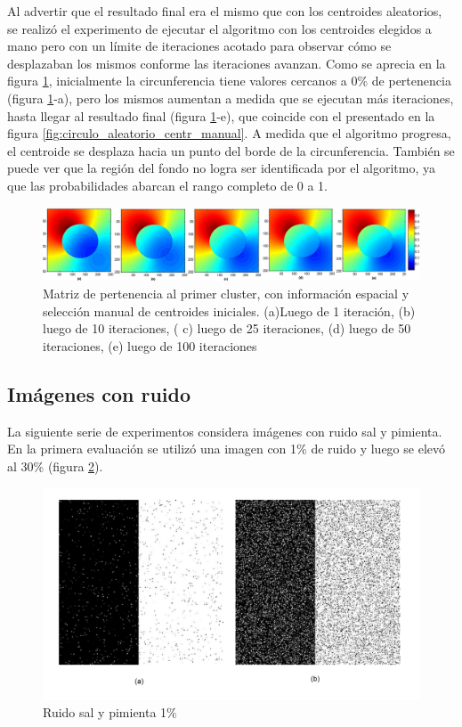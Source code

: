 Al advertir que el resultado final era el mismo que con los centroides aleatorios,  se realizó el experimento de ejecutar el algoritmo con los centroides elegidos a mano pero con un límite de iteraciones acotado para observar cómo se desplazaban los mismos conforme las iteraciones avanzan. Como se aprecia en la figura \ref{fig:circulo_iteraciones}, inicialmente la circunferencia tiene valores cercanos a $0\%$ de pertenencia (figura \ref{fig:circulo_iteraciones}-a), pero los mismos aumentan a medida que se ejecutan más iteraciones, hasta llegar al resultado final (figura \ref{fig:circulo_iteraciones}-e), que coincide con el presentado en la figura \ref{fig:circulo_aleatorio_centr_manual}. A medida que el algoritmo progresa, el centroide se desplaza hacia un punto del borde de la circunferencia. También se puede ver que la región del fondo no logra ser identificada por el algoritmo, ya que las probabilidades abarcan el rango completo de 0 a 1. 

\begin{figure}[h]
\centering
\includegraphics[scale=0.08]{images/circulo_iteraciones_x1.jpg}
\caption{Matriz de pertenencia al primer cluster, con información espacial y selección manual de centroides iniciales. (a)Luego de 1 iteración, (b) luego de 10 iteraciones, ( c) luego de 25 iteraciones, (d) luego de 50 iteraciones, (e) luego de 100 iteraciones}
\label{fig:circulo_iteraciones}
\end{figure}

\subsection{Imágenes con ruido}
La siguiente serie de experimentos considera imágenes con ruido sal y pimienta. En la primera evaluación se utilizó una imagen con 1\% de ruido y luego se elevó al 30\% (figura \ref{fig:mitad_mitad_ruido_1p}).

\begin{figure}[H]
\centering
\includegraphics[scale=0.06]{images/original_mitad_con_ruido_1y30.jpg}
\caption{Ruido sal y pimienta 1\%}
\label{fig:mitad_mitad_ruido_1p}
\end{figure}

